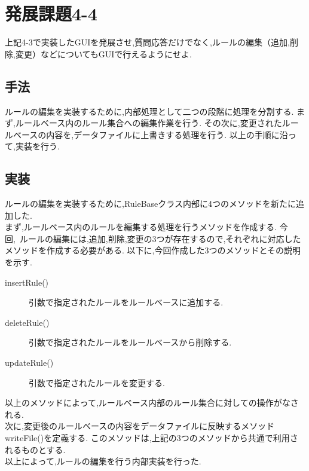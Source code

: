 \documentclass[uplatex,12pt]{jsarticle}
\begin{document}
\section{発展課題4-4}
\begin{screen}
    上記4-3で実装したGUIを発展させ,質問応答だけでなく,ルールの編集（追加,削除,変更）などについてもGUIで行えるようにせよ.
\end{screen}
\subsection{手法}
ルールの編集を実装するために,内部処理として二つの段階に処理を分割する.
まず,ルールベース内のルール集合への編集作業を行う.
その次に,変更されたルールベースの内容を,データファイルに上書きする処理を行う.
以上の手順に沿って,実装を行う.

\subsection{実装}
ルールの編集を実装するために,RuleBaseクラス内部に4つのメソッドを新たに追加した. \\

まず,ルールベース内のルールを編集する処理を行うメソッドを作成する.
今回, ルールの編集には,追加,削除,変更の3つが存在するので,それぞれに対応したメソッドを作成する必要がある.
以下に,今回作成した3つのメソッドとその説明を示す.
\begin{description}
    \item[insertRule()] 引数で指定されたルールをルールベースに追加する.
    \item[deleteRule()] 引数で指定されたルールをルールベースから削除する.
    \item[updateRule()] 引数で指定されたルールを変更する.
\end{description}
以上のメソッドによって,ルールベース内部のルール集合に対しての操作がなされる. \\

次に,変更後のルールベースの内容をデータファイルに反映するメソッドwriteFile()を定義する.
このメソッドは,上記の3つのメソッドから共通で利用されるものとする. \\

以上によって,ルールの編集を行う内部実装を行った.
\end{document}
